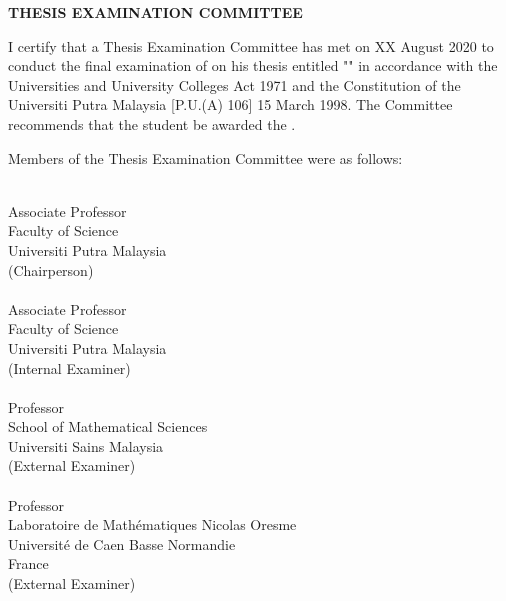 \begin{center}
		{\bf THESIS EXAMINATION COMMITTEE}
\end{center}
	
	
\begin{singlespace}
I certify that a Thesis Examination Committee has met on
{{XX August 2020}} to conduct the final
examination of {{\authorname}} on his
thesis entitled "{{\thesistitle}}" in accordance with the
Universities and University Colleges Act 1971 and the Constitution
of the Universiti Putra Malaysia [P.U.(A) 106] 15 March 1998. The
Committee recommends that the student be awarded the {\degree}.

Members of the Thesis Examination Committee were as follows:

{\bf{\chairViva}}\\
Associate Professor\\
Faculty of Science\\
Universiti Putra Malaysia\\
(Chairperson)\\

{\bf{\examinerA}}\\
Associate Professor\\
Faculty of Science\\
Universiti Putra Malaysia\\
(Internal Examiner)\\

{\bf{\examinerB}}\\
Professor\\
School of Mathematical Sciences\\
Universiti Sains Malaysia\\
(External Examiner)\\

{\bf{\examinerC}}\\
Professor\\
Laboratoire de Math\'{e}matiques Nicolas Oresme\\
Universit\'{e} de Caen Basse Normandie\\
France\\
(External Examiner)\\\

\vfill


\end{singlespace}
